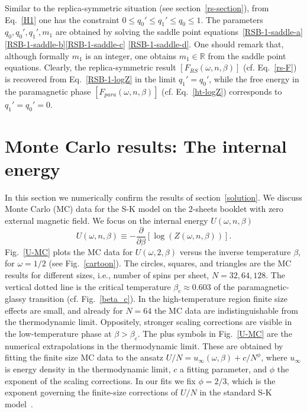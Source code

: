 \documentclass[twocolumn,superscriptaddress,prb,10pt]{revtex4-1}
\begin{document}
%
Similar to the replica-symmetric situation (see section~\ref{rs-section}), 
from Eq.~\eqref{H1} one has the constraint $0\le q_0'\le q_1'\le q_0\le 1$.
The parameters $q_0,q_0',q_1',m_1$ are obtained by solving the saddle 
point equations~\eqref{RSB-1-saddle-a}\eqref{RSB-1-saddle-b}\eqref{RSB-1-saddle-c}
\eqref{RSB-1-saddle-d}. One should remark that, although formally $m_1$ is an 
integer, one obtains $m_1\in\mathbb{R}$ from the saddle point equations. 
Clearly, the replica-symmetric result $[F_{RS}(\omega,n,\beta)]$ (cf. 
Eq.~\eqref{rs-F}) is recovered from Eq.~\eqref{RSB-1-logZ} in the limit 
$q_1'=q_0'$, while the free energy in the paramagnetic phase $[F_{para}(\omega,n,
\beta)]$ (cf. Eq.~\eqref{ht-logZ}) corresponds to $q_1'=q_0'=0$.

\section{Monte Carlo results: The internal energy}
\label{mc-results}

In this section we numerically confirm the results of section~\ref{solution}. 
We discuss Monte Carlo (MC) data for the S-K model on the $2$-sheets booklet 
with zero external magnetic field. We focus on the internal energy $U(\omega,n,
\beta)$ 
%
\begin{equation}
\label{U-def}
U(\omega,n,\beta)\equiv-\frac{\partial}{\partial\beta}
[\log(Z(\omega,n,\beta))]. 
\end{equation}
%  
Fig.~\ref{U-MC} plots the MC data for $U(\omega,2,\beta)$ versus the inverse temperature 
$\beta$, for $\omega=1/2$ (see Fig.~\ref{cartoon}). The circles, squares, and triangles 
are the MC results for different sizes, i.e., number of spins per sheet, $N=32,64,128$. 
The vertical dotted line is the critical temperature $\beta_c\approx 0.603$ of 
the paramagnetic-glassy transition (cf. Fig.~\ref{beta_c}). In the high-temperature 
region finite size effects are small, and already for $N=64$ the MC data are indistinguishable 
from the thermodynamic limit. Oppositely, stronger scaling corrections are visible in 
the low-temperature phase at $\beta>\beta_c$. 
The plus symbols in Fig.~\ref{U-MC} are the numerical extrapolations in the 
thermodynamic limit. These are obtained by fitting the finite size MC data 
to the ansatz $U/N=u_{\infty}(\omega,\beta)+c/N^{\phi}$, where 
$u_{\infty}$ is energy density in the thermodynamic limit, $c$ a fitting parameter, and 
$\phi$ the exponent of the scaling corrections. In our fits we fix $\phi=2/3$, which 
is the exponent governing the finite-size corrections of $U/N$ in 
the standard S-K model~\cite{billoire-2007,aspelmeier-2008}. 
\end{document}
